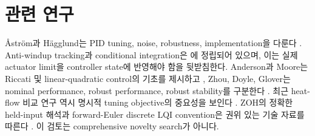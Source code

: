 \section{관련 연구}
{\AA}str\"om과 H\"agglund는 PID tuning, noise, robustness, implementation을 다룬다 \cite{astrom2006}. Anti-windup tracking과 conditional integration은 \cite{astrom1989,rundqwist1990}에 정립되어 있으며, 이는 실제 actuator limit을 controller state에 반영해야 함을 뒷받침한다. Anderson과 Moore는 Riccati 및 linear-quadratic control의 기초를 제시하고 \cite{anderson1990}, Zhou, Doyle, Glover는 nominal performance, robust performance, robust stability를 구분한다 \cite{zhou1996}. 최근 heat-flow 비교 연구 역시 명시적 tuning objective의 중요성을 보인다 \cite{teppa2025}. ZOH의 정확한 held-input 해석과 forward-Euler discrete LQI convention은 권위 있는 기술 자료를 따른다 \cite{mathworks_zoh,mathworks_lqi}. 이 검토는 comprehensive novelty search가 아니다.
